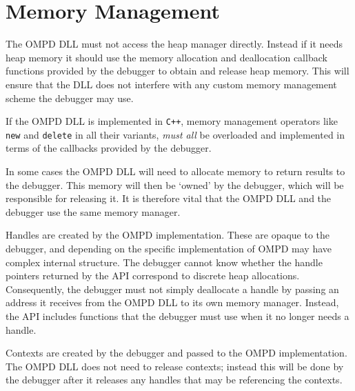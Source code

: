 \section{Memory Management}
\label{memory-management:sec}

The OMPD DLL must not access the heap manager directly. Instead if it needs 
heap memory it should use the memory allocation and deallocation callback 
functions provided by the debugger to obtain and release heap memory.
This will ensure that the DLL does not interfere with any custom memory 
management scheme the debugger may use.

If the OMPD DLL is implemented in \texttt{C++}, memory management operators 
like \texttt{new} and \texttt{delete} in all their variants, \emph{must all} be 
overloaded and implemented in terms of the callbacks provided by the debugger.

In some cases the OMPD DLL will need to allocate memory to
return results to the debugger. This memory will then be `owned' by the 
debugger, which will be responsible for releasing it. It is therefore vital 
that the OMPD DLL and the debugger use the same memory manager.

Handles are created by the OMPD implementation. These are opaque to the 
debugger, and depending on the specific implementation of OMPD may have complex 
internal structure.
The debugger cannot know whether the handle pointers 
returned by the API correspond to discrete heap allocations. Consequently, the 
debugger must not simply deallocate a handle by passing an address it receives 
from the OMPD DLL to its own memory manager. Instead, the API includes 
functions that the debugger must use when it no longer needs a handle.

Contexts are created by the debugger and passed to the OMPD implementation.
The OMPD DLL does not need to release contexts; instead this will be done by 
the debugger after it releases any handles that may be referencing the contexts.